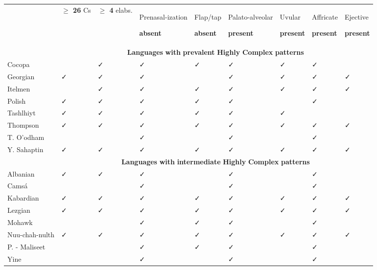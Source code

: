 \begin{table}
\begin{tabularx}{\textwidth}{XXXXXXXXX}
\lsptoprule
 & \textbf{${\geq}$ 26} Cs & \textbf{${\geq}$ 4} elabs. & { Prenasal-ization}

 \textbf{absent} & { Flap/tap}

 \textbf{absent} & { Palato-alveolar}

 \textbf{present} & { Uvular}

 \textbf{present} & { Affricate}

 \textbf{present} & { Ejective}

 \textbf{present}\\
& \multicolumn{8}{c}{ \textbf{Languages} \textbf{with} \textbf{prevalent} \textbf{Highly} \textbf{Complex} \textbf{patterns}}\\
\hhline{~--------}
 Cocopa &  & ✓ & ✓ & ✓ & ✓ & ✓ & ✓ & \\
\hhline{~--------}
 Georgian & ✓ & ✓ & ✓ &  & ✓ & ✓ & ✓ & ✓\\
\hhline{~--------}
 Itelmen &  & ✓ & ✓ & ✓ & ✓ & ✓ & ✓ & ✓\\
\hhline{~--------}
 Polish & ✓ & ✓ & ✓ & ✓ & ✓ &  & ✓ & \\
\hhline{~--------}
 Tashlhiyt & ✓ & ✓ & ✓ & ✓ & ✓ & ✓ &  & \\
\hhline{~--------}
 Thompson & ✓ & ✓ & ✓ & ✓ & ✓ & ✓ & ✓ & ✓\\
\hhline{~--------}
 T. O’odham &  &  & ✓ &  & ✓ &  & ✓ & \\
\hhline{~--------}
 Y. Sahaptin & ✓ & ✓ & ✓ & ✓ & ✓ & ✓ & ✓ & ✓\\
& \multicolumn{8}{c}{ \textbf{Languages} \textbf{with} \textbf{intermediate} \textbf{Highly} \textbf{Complex} \textbf{patterns}}\\
\hhline{~--------}
 Albanian & ✓ & ✓ & ✓ &  & ✓ &  & ✓ & \\
\hhline{~--------}
 Camsá &  &  & ✓ &  & ✓ &  & ✓ & \\
\hhline{~--------}
 Kabardian & ✓ & ✓ & ✓ & ✓ & ✓ & ✓ & ✓ & ✓\\
\hhline{~--------}
 Lezgian & ✓ & ✓ & ✓ & ✓ & ✓ & ✓ & ✓ & ✓\\
\hhline{~--------}
 Mohawk &  &  & ✓ & ✓ & ✓ &  & ✓ & \\
\hhline{~--------}
 Nuu-chah-nulth & ✓ & ✓ & ✓ & ✓ & ✓ & ✓ & ✓ & ✓\\
\hhline{~--------}
 P. - Maliseet &  &  & ✓ & ✓ & ✓ &  & ✓ & \\
\hhline{~--------}
 Yine &  &  & ✓ &  & ✓ &  & ✓ & \\

\end{tabularx}
\end{table}
